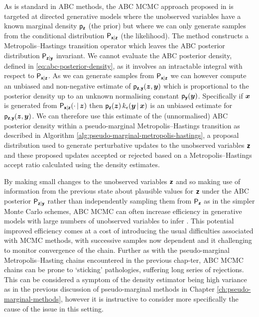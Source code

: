 As is standard in \ac{ABC} methods, the \ac{ABC} \ac{MCMC} approach proposed in \citep{marjoram2003markov} is targeted at directed generative models where the unobserved variables have a known marginal density $\mathsf{p}_{\boldsymbol{\mathsf{z}}}$ (the prior) but where we can only generate samples from the conditional distribution $\mathsf{P}_{\boldsymbol{\mathsf{x}}|\boldsymbol{\mathsf{z}}}$ (the likelihood). The method constructs a Metropolis--Hastings transition operator which leaves the \ac{ABC} posterior distribution $\mathsf{P}_{\boldsymbol{\mathsf{z}}|\boldsymbol{\mathsf{y}}}$ invariant. We cannot evaluate the \ac{ABC} posterior density, defined in \eqref{eq:abc-posterior-density}, as it involves an intractable integral with respect to $\mathsf{P}_{\boldsymbol{\mathsf{x}}|\boldsymbol{\mathsf{z}}}$. As we can generate samples from $\mathsf{P}_{\boldsymbol{\mathsf{x}}|\boldsymbol{\mathsf{z}}}$ we can however compute an unbiased and non-negative estimate of $\mathsf{p}_{\boldsymbol{\mathsf{z}},\boldsymbol{\mathsf{y}}}(\boldsymbol{z},\boldsymbol{y})$ which is proportional to the posterior density up to an unknown normalising constant $\mathsf{p}_{\boldsymbol{\mathsf{y}}}(\boldsymbol{y})$. Specifically if $\boldsymbol{x}$ is generated from $\mathsf{P}_{\boldsymbol{\mathsf{x}}|\boldsymbol{\mathsf{z}}}(\cdot \operatorname{|} \boldsymbol{z})$ then $\mathsf{p}_{\boldsymbol{\mathsf{z}}}(\boldsymbol{z})\,k_\epsilon(\boldsymbol{y}\operatorname{|}\boldsymbol{x})$ is an unbiased estimate for $\mathsf{p}_{\boldsymbol{\mathsf{z}},\boldsymbol{\mathsf{y}}}(\boldsymbol{z},\boldsymbol{y})$. We can therefore use this estimate of the (unnormalised) \ac{ABC} posterior density within a pseudo-marginal Metropolis--Hastings transition as described in Algorithm \ref{alg:pseudo-marginal-metropolis-hastings}, a proposal distribution used to generate perturbative updates to the unobserved variables $\boldsymbol{\mathsf{z}}$ and these proposed updates accepted or rejected based on a Metropolis--Hastings accept ratio calculated using the density estimates.

By making small changes to the unobserved variables $\boldsymbol{\mathsf{z}}$ and so making use of information from the previous state about plausible values for $\boldsymbol{\mathsf{z}}$ under the \ac{ABC} posterior $\mathsf{P}_{\boldsymbol{\mathsf{z}}|\boldsymbol{\mathsf{y}}}$  rather than independently sampling them from $\mathsf{P}_{\boldsymbol{\mathsf{z}}}$ as in the simpler Monte Carlo schemes, \ac{ABC} \ac{MCMC} can often increase efficiency in generative models with large numbers of unobserved variables to infer \cite{sisson2011likelihood}. This potential improved efficiency comes at a cost of introducing the usual difficulties associated with \ac{MCMC} methods, with successive samples now dependent and it challenging to monitor convergence of the chain. Further as with the pseudo-marginal Metropolis--Hasting chains encountered in the previous chap-ter, \ac{ABC} \ac{MCMC} chains can be prone to `sticking' pathologies, suffering long series of rejections. This can be considered a symptom of the density estimator being high variance as in the previous discussion of pseudo-marginal methods in Chapter \ref{ch:pseudo-marginal-methods}, however it is instructive to consider more specifically the cause of the issue in this setting. 


